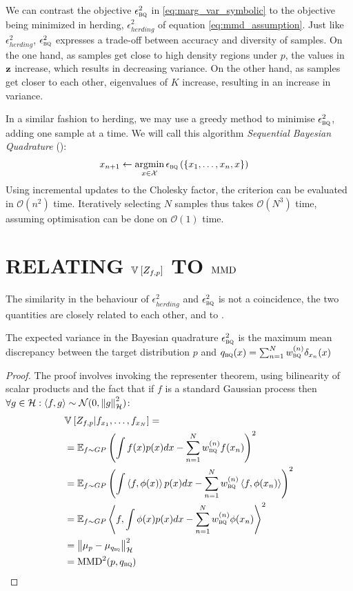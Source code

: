 \documentclass[]{article}
\begin{document}
We can contrast the \bq{} objective $\epsilon^{2}_{{\textsc{bq}}{}}$ in \eqref{eq:marg_var_symbolic} to the objective being minimized in herding, $\epsilon^{2}_{herding}$ of equation \eqref{eq:mmd_assumption}. Just like $\epsilon^{2}_{herding}$, $\epsilon^{2}_{{\textsc{bq}}{}}$ expresses a trade-off between accuracy and diversity of samples. On the one hand, as samples get close to high density regions under $p$, the values in ${\bf{z}}$ increase, which results in decreasing variance. On the other hand, as samples get closer to each other, eigenvalues of $K$ increase, resulting in an increase in variance. 

In a similar fashion to herding, we may use a greedy method to minimise $\epsilon^{2}_{{\textsc{bq}}{}}$, adding one sample at a time. We will call this algorithm \emph{Sequential Bayesian Quadrature} (\sbq{}):
\begin{align}
\vx_{n+1} &\leftarrow \argmin_{\vx \in \mathcal{X}} \epsilon_{\bq{}}\left(\{\vx_1,\ldots,\vx_{n},\vx\}\right)
\end{align}
Using incremental updates to the Cholesky factor, the criterion can be evaluated in $\mathcal{O}(n^2)$ time. Iteratively selecting $N$ samples thus takes $\mathcal{O}(N^3)$ time, assuming optimisation can be done on $\mathcal{O}(1)$ time.

\section{RELATING $\mathbb{V}_{} \left[ {Z_{f,p}} \right]$ TO ${\rm MMD}$}

The similarity in the behaviour of $\epsilon^{2}_{herding}$ and $\epsilon^{2}_{{\textsc{bq}}{}}$ is not a coincidence, the two quantities are closely related to each other, and to \mmd.
	
\begin{prop} The expected variance in the Bayesian quadrature $\epsilon^{2}_{{\textsc{bq}}{}}$  is the maximum mean discrepancy between the target distribution $p$ and $q_{{\textsc{bq}}{}}(x) = \sum_{n=1}^{N}w^{(n)}_{{\textsc{bq}}{}}\delta_{x_n}(x)$
\end{prop}
%
\begin{proof}
The proof involves invoking the representer theorem, using bilinearity of scalar products and the fact that if $f$ is a standard Gaussian process then $\forall g\in\mathcal{H}: \left\langle f,g\right\rangle \sim \mathcal{N}(0,\left\|g\right\|_{\mathcal{H}}^2)$:
\begin{align}
&\mathbb{V}_{} \left[ {Z_{f,p}\vert f_{x_1}, \dots, f_{x_N}} \right]=\\
	&= \mathbb{E}_{f\sim GP} \left( \int f(x) p(x) dx - \sum_{n=1}^{N}w^{(n)}_{{\textsc{bq}}{}} f(x_n)\right)^2\\
	&= \mathbb{E}_{f\sim GP} \left( \int \left\langle f, \phi (x)\right\rangle p(x) dx - \sum_{n=1}^{N}w^{(n)}_{{\textsc{bq}}{}} \left\langle f, \phi (x_n)\right\rangle\right)^2\\
	&= \mathbb{E}_{f\sim GP} \left\langle f ,  \int\phi(x) p(x) dx - \sum_{n=1}^{N}w^{(n)}_{{\textsc{bq}}{}}\phi(x_n)\right\rangle^2\\
	&= \left\|\mu_p - \mu_{q_{{\textsc{bq}}{}}}\right\|_{\mathcal{H}}^2\\
	&= {\rm MMD}^2(p,q_{{\textsc{bq}}{}})
\end{align}
\end{proof}
\end{document}
